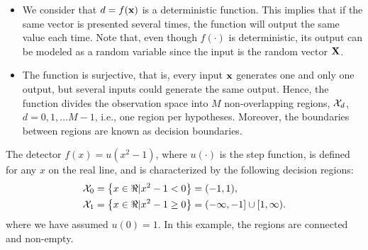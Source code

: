 \begin{itemize}
    \item We consider that $d = f({\bf x})$ is a deterministic function. This implies that if the same vector is presented several times, the function will output the same value each time. Note that, even though $f(\cdot)$ is deterministic, its output can be modeled as a random variable since the input is the random vector $\bf X$.
    \item The function is surjective, that is, every input ${\bf x}$ generates one and only one output, but several inputs could generate the same output. Hence, the function divides the observation space into $M$ non-overlapping regions, ${\cal X}_d$, $d = 0, 1, \ldots M-1$, i.e., one region per hypotheses. Moreover, the boundaries between regions are known as decision boundaries.
\end{itemize}

\begin{example}
The detector $f(x) = u(x^2 -1)$, where $u(\cdot)$ is the step function, is defined for any $x$ on the real line, and is characterized by the following decision regions:
\begin{align}{\cal X}_0 & = \left\{ x \in \Re | x^2-1 < 0\right\} = (-1,1), \nonumber\\
{\cal X}_1 & = \left\{ x \in \Re | x^2-1 \geq 0\right\} = (-\infty,-1] \cup [1,\infty). \nonumber
\end{align}
where we have assumed $u(0)=1$. In this example, the regions are connected and non-empty.
\end{example}

